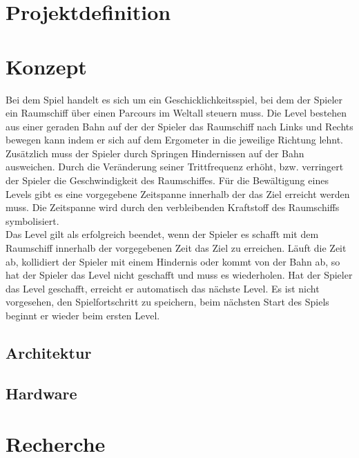 

\chapter{Projektdefinition}


\chapter{Konzept}
Bei dem Spiel handelt es sich um ein Geschicklichkeitsspiel, bei dem der Spieler ein Raumschiff über einen Parcours im Weltall steuern muss. Die Level bestehen aus einer geraden Bahn auf der der Spieler das Raumschiff nach Links und Rechts bewegen kann indem er sich auf dem Ergometer in die jeweilige Richtung lehnt. Zusätzlich muss der Spieler durch Springen Hindernissen auf der Bahn ausweichen. Durch die Veränderung seiner Trittfrequenz erhöht, bzw. verringert der Spieler die Geschwindigkeit des Raumschiffes. Für die Bewältigung eines Levels gibt es eine vorgegebene Zeitspanne innerhalb der das Ziel erreicht werden muss. Die Zeitspanne wird durch den verbleibenden Kraftstoff des Raumschiffs symbolisiert.\\
Das Level gilt als erfolgreich beendet, wenn der Spieler es schafft mit dem Raumschiff innerhalb der vorgegebenen Zeit das Ziel zu erreichen. Läuft die Zeit ab, kollidiert der Spieler mit einem Hindernis oder kommt von der Bahn ab, so hat der Spieler das Level nicht geschafft und muss es wiederholen. Hat der Spieler das Level geschafft, erreicht er automatisch das nächste Level. Es ist nicht vorgesehen, den Spielfortschritt zu speichern, beim nächsten Start des Spiels beginnt er wieder beim ersten Level.
\section{Architektur}

\section{Hardware}


 
\chapter{Recherche}
